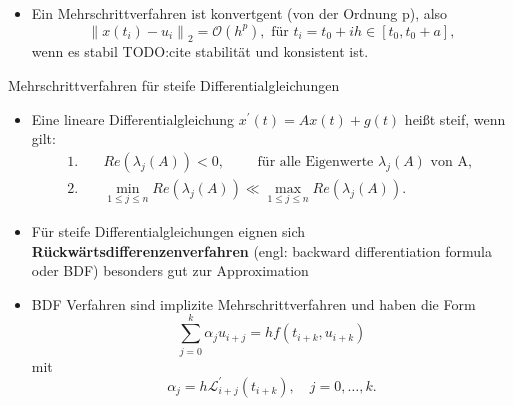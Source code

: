 \begin{frame}
    \begin{itemize}
        \item<1-> Ein Mehrschrittverfahren ist konvertgent (von der Ordnung p), also
        \[
            \left\lVert x(t_i) - u_i \right\rVert_2 = \mathcal{O}(h^p), \text{ für } t_i=t_0+ih \in [t_0,t_0+a],
        \]
        wenn es stabil TODO:cite stabilität und konsistent ist.
    \end{itemize}
\end{frame}

\begin{frame}{Mehrschrittverfahren für steife Differentialgleichungen}
    \begin{itemize}
        \item<1-> Eine lineare Differentialgleichung $x^{\prime}(t)=Ax(t)+g(t)$ heißt steif, wenn gilt:
        \begin{align*}
            1.& \quad Re(\lambda_j(A)) < 0, \qquad \text{ für alle Eigenwerte } \lambda_j(A) \text{ von A, }\\
            2.& \quad \min\limits_{1 \leq j \leq n} Re(\lambda_j(A)) \ll \max\limits_{1 \leq j \leq n} Re(\lambda_j(A)).
        \end{align*}
        \item<2-> Für steife Differentialgleichungen eignen sich \textbf{Rückwärtsdifferenzenverfahren}
        (engl: backward differentiation formula oder BDF) besonders gut zur Approximation
        \item<3-> BDF Verfahren sind implizite Mehrschrittverfahren und haben die Form
        \[
            \sum_{j=0}^{k}\alpha_j u_{i+j} = h f(t_{i+k}, u_{i+k})
        \]
        mit
        \[
            \alpha_j = h \mathcal{L}^{\prime}_{i+j} (t_{i+k}), \quad j=0,\dots,k.
        \]
    \end{itemize}
\end{frame}


